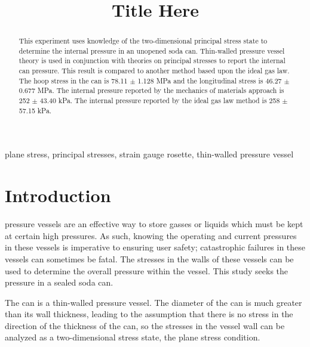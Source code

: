 \documentclass[10pt,journal,letterpaper]{IEEEtran}
\begin{document}
\title{Title Here}

\author{
}

\maketitle
\thispagestyle{empty}

\newcommand{\todo}{\textcolor{red}{???}}

\begin{abstract}
This experiment uses knowledge of the two-dimensional principal stress state to determine the internal pressure in an unopened soda can.
Thin-walled pressure vessel theory is used in conjunction with theories on principal stresses to report the internal can pressure.
This result is compared to another method based upon the ideal gas law.
The hoop stress in the can is 78.11 $\pm$ 1.128 MPa and the longitudinal stress is 46.27 $\pm$ 0.677 MPa.
The internal pressure reported by the mechanics of materials approach is 252 $\pm$ 43.40 kPa.
The internal pressure reported by the ideal gas law method is 258 $\pm$ 57.15 kPa.
\end{abstract}

\begin{IEEEkeywords}
plane stress, principal stresses, strain gauge rosette, thin-walled pressure vessel
\end{IEEEkeywords}

\section{Introduction}
 pressure vessels are an effective way to store gasses or liquids which must be kept at certain high pressures.
As such, knowing the operating and current pressures in these vessels is imperative to ensuring user safety; catastrophic failures in these vessels can sometimes be fatal.
The stresses in the walls of these vessels can be used to determine the overall pressure within the vessel.
This study seeks the pressure in a sealed soda can.

The can is a thin-walled pressure vessel.
The diameter of the can is much greater than its wall thickness, leading to the assumption that there is no stress in the direction of the thickness of the can, so the stresses in the vessel wall can be analyzed as a two-dimensional stress state, the plane stress condition.
\end{document}
